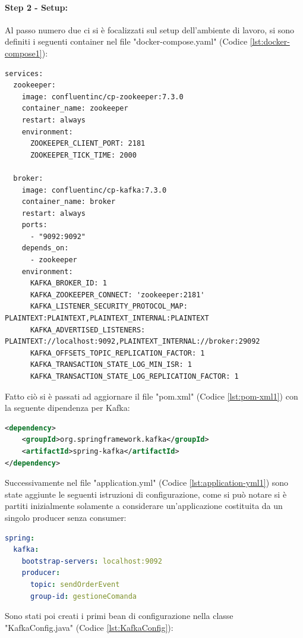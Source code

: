 \paragraph{Step 2 - Setup:}
Al passo numero due ci si è focalizzati sul setup dell’ambiente di lavoro, si sono definiti i seguenti container nel file "docker-compose.yaml" (Codice \vref{lst:docker-compose1}):
\begin{lstlisting}[language=docker-compose, caption={Setup del docker-compose.yaml per l'adattatore Kafka}, label=lst:docker-compose1]
services:  
  zookeeper:
    image: confluentinc/cp-zookeeper:7.3.0
    container_name: zookeeper
    restart: always
    environment:
      ZOOKEEPER_CLIENT_PORT: 2181
      ZOOKEEPER_TICK_TIME: 2000

  broker:
    image: confluentinc/cp-kafka:7.3.0
    container_name: broker
    restart: always
    ports:
      - "9092:9092"
    depends_on:
      - zookeeper
    environment:
      KAFKA_BROKER_ID: 1
      KAFKA_ZOOKEEPER_CONNECT: 'zookeeper:2181'
      KAFKA_LISTENER_SECURITY_PROTOCOL_MAP: PLAINTEXT:PLAINTEXT,PLAINTEXT_INTERNAL:PLAINTEXT
      KAFKA_ADVERTISED_LISTENERS: PLAINTEXT://localhost:9092,PLAINTEXT_INTERNAL://broker:29092
      KAFKA_OFFSETS_TOPIC_REPLICATION_FACTOR: 1
      KAFKA_TRANSACTION_STATE_LOG_MIN_ISR: 1
      KAFKA_TRANSACTION_STATE_LOG_REPLICATION_FACTOR: 1
\end{lstlisting}
Fatto ciò si è passati ad aggiornare il file "pom.xml" (Codice \vref{lst:pom-xml1}) con la seguente dipendenza per Kafka: 
\begin{lstlisting}[language=XML, caption={Aggiornamento dipendenze nel pom.xml per includere spring-kafka}, label=lst:pom-xml1]
<dependency>
    <groupId>org.springframework.kafka</groupId>
    <artifactId>spring-kafka</artifactId>
</dependency>
\end{lstlisting}
Successivamente nel file "application.yml" (Codice \vref{lst:application-yml1}) sono state aggiunte le seguenti istruzioni di configurazione, come si può notare si è partiti inizialmente solamente a considerare un'applicazione costituita da un singolo producer senza consumer:
\begin{lstlisting}[language=yaml, caption={Aggiornamento del file `application.yml` per il producer Kafka}, label=lst:application-yml1]
spring:
  kafka:
    bootstrap-servers: localhost:9092
    producer:
      topic: sendOrderEvent
      group-id: gestioneComanda
\end{lstlisting}
Sono stati poi creati i primi bean di configurazione nella classe "KafkaConfig.java" (Codice \vref{lst:KafkaConfig}):
